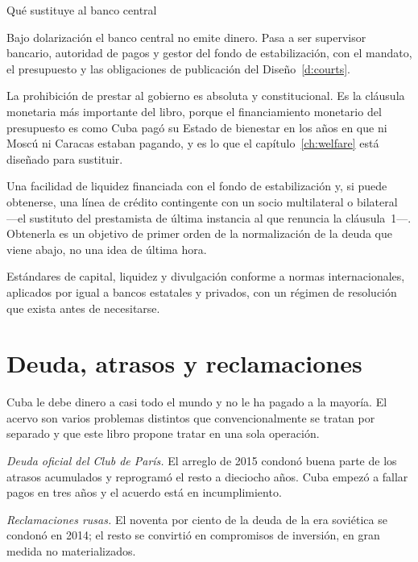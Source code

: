 \begin{design}{Qué sustituye al banco central}
\label{d:bank}
\begin{rules}
 Bajo dolarización el banco central no emite dinero. Pasa a ser
supervisor bancario, autoridad de pagos y gestor del fondo de estabilización, con el
mandato, el presupuesto y las obligaciones de publicación del Diseño~\ref{d:courts}.

 La prohibición de prestar al gobierno es absoluta y
constitucional. Es la cláusula monetaria más importante del libro, porque el
financiamiento monetario del presupuesto es como Cuba pagó su Estado de bienestar en
los años en que ni Moscú ni Caracas estaban pagando, y es lo que el
capítulo~\ref{ch:welfare} está diseñado para sustituir.

 Una facilidad de liquidez financiada con el fondo de estabilización y,
si puede obtenerse, una línea de crédito contingente con un socio multilateral o
bilateral ---el sustituto del prestamista de última instancia al que renuncia la
cláusula~1---. Obtenerla es un objetivo de primer orden de la normalización de la deuda
que viene abajo, no una idea de última hora.

 Estándares de capital, liquidez y divulgación conforme a
normas internacionales, aplicados por igual a bancos estatales y privados, con un
régimen de resolución que exista antes de necesitarse.
\end{rules}
\end{design}

\section{Deuda, atrasos y reclamaciones}

Cuba le debe dinero a casi todo el mundo y no le ha pagado a la mayoría. El acervo son
varios problemas distintos que convencionalmente se tratan por separado y que este
libro propone tratar en una sola operación.

\emph{Deuda oficial del Club de París.} El arreglo de 2015 condonó buena parte de los
atrasos acumulados y reprogramó el resto a dieciocho años. Cuba empezó a fallar pagos en
tres años y el acuerdo está en incumplimiento.

\emph{Reclamaciones rusas.} El noventa por ciento de la deuda de la era soviética se
condonó en 2014; el resto se convirtió en compromisos de inversión, en gran medida no
materializados.

